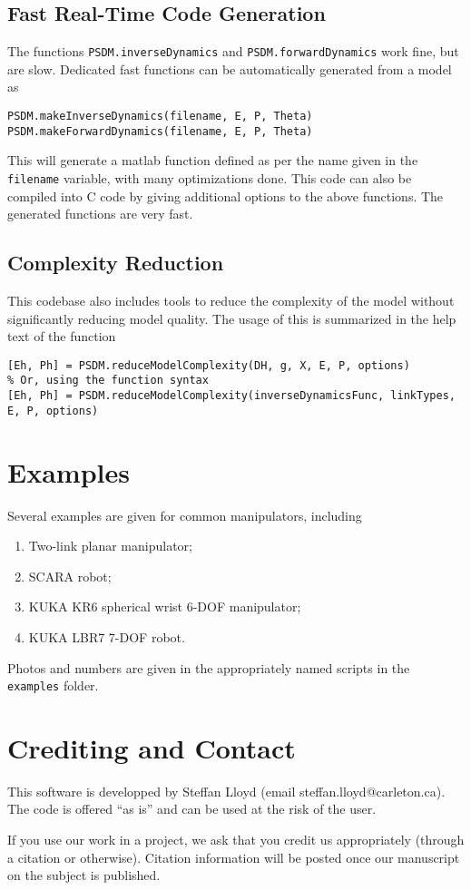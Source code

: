 \documentclass[12pt]{article}
\begin{document}
\subsection{Fast Real-Time Code Generation}
The functions \texttt{PSDM.inverseDynamics} and \texttt{PSDM.forwardDynamics} work fine, but are slow. Dedicated fast functions can be automatically generated from a model as
\begin{lstlisting}
PSDM.makeInverseDynamics(filename, E, P, Theta)
PSDM.makeForwardDynamics(filename, E, P, Theta)
\end{lstlisting}\vspace{1em}
This will generate a matlab function defined as per the name given in the \texttt{filename} variable, with many optimizations done. This code can also be compiled into C code by giving additional options to the above functions. The generated functions are very fast.

\subsection{Complexity Reduction}
This codebase also includes tools to reduce the complexity of the model without significantly reducing model quality. The usage of this is summarized in the help text of the function
\begin{lstlisting}
[Eh, Ph] = PSDM.reduceModelComplexity(DH, g, X, E, P, options)
% Or, using the function syntax
[Eh, Ph] = PSDM.reduceModelComplexity(inverseDynamicsFunc, linkTypes, E, P, options)
\end{lstlisting}

\section{Examples}

Several examples are given for common manipulators, including
\begin{enumerate}[itemsep=0pt]
	\item Two-link planar manipulator;
	\item SCARA robot;
	\item KUKA KR6 spherical wrist 6-DOF manipulator;
	\item KUKA LBR7 7-DOF robot.
\end{enumerate}
Photos and numbers are given in the appropriately named scripts in the \texttt{examples} folder.

\section{Crediting and Contact}

This software is developped by Steffan Lloyd (email steffan.lloyd@carleton.ca). The code is offered ``as is'' and can be used at the risk of the user.

If you use our work in a project, we ask that you credit us appropriately (through a citation or otherwise). Citation information will be posted once our manuscript on the subject is published.



\end{document}
